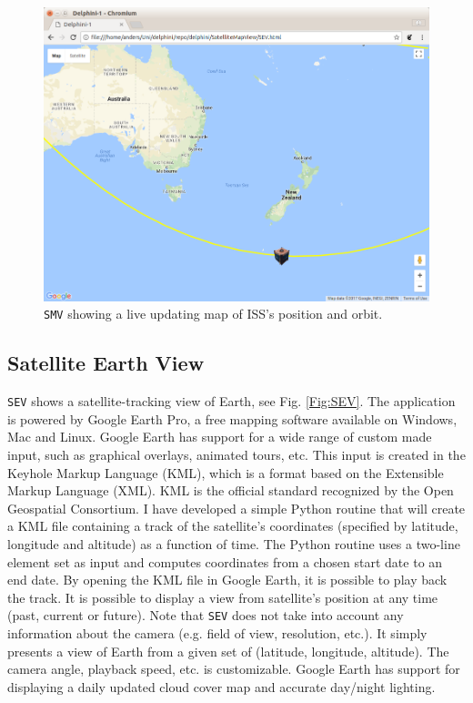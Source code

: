 \documentclass[10pt,a4paper]{article}
\begin{document}
\begin{figure}
\includegraphics[width=\textwidth]{../SMV.png}
\caption{\texttt{SMV} showing a live updating map of ISS's position and orbit.}
\label{Fig:SMV}
\end{figure}

\subsection{Satellite Earth View}
\texttt{SEV} shows a satellite-tracking view of Earth, see Fig. \ref{Fig:SEV}. The application is powered by Google Earth Pro, a free mapping software available on Windows, Mac and Linux. Google Earth has support for a wide range of custom made input, such as graphical overlays, animated tours, etc. This input is created in the Keyhole Markup Language (KML), which is a format based on the Extensible Markup Language (XML). KML is the official standard recognized by the Open Geospatial Consortium. I have developed a simple Python routine that will create a KML file containing a track of the satellite's coordinates (specified by latitude, longitude and altitude) as a function of time. The Python routine uses a two-line element set as input and computes coordinates from a chosen start date to an end date. By opening the KML file in Google Earth, it is possible to play back the track. It is possible to display a view from satellite's position at any time (past, current or future). Note that \texttt{SEV} does not take into account any information about the camera (e.g. field of view, resolution, etc.). It simply presents a view of Earth from a given set of (latitude, longitude, altitude). The camera angle, playback speed, etc. is customizable. Google Earth has support for displaying a daily updated cloud cover map and accurate day/night lighting.
\end{document}
